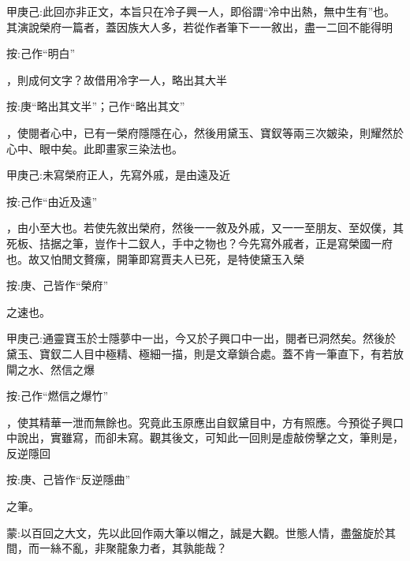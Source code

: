 
\begin{parag}
    \begin{note}甲庚己:此回亦非正文，本旨只在冷子興一人，即俗謂“冷中出熱，無中生有”也。其演說榮府一篇者，蓋因族大人多，若從作者筆下一一敘出，盡一二回不能得明\begin{subnote}按:己作“明白”\end{subnote}，則成何文字？故借用冷字一人，略出其大半\begin{subnote}按:庚“略出其文半”；己作“略出其文”\end{subnote}，使閱者心中，已有一榮府隱隱在心，然後用黛玉、寶釵等兩三次皴染，則耀然於心中、眼中矣。此即畫家三染法也。\end{note}
\end{parag}


\begin{parag}
    \begin{note}甲庚己:未寫榮府正人，先寫外戚，是由遠及近\begin{subnote}按:己作“由近及遠”\end{subnote}，由小至大也。若使先敘出榮府，然後一一敘及外戚，又一一至朋友、至奴僕，其死板、拮据之筆，豈作十二釵人，手中之物也？今先寫外戚者，正是寫榮國一府也。故又怕閒文贅瘰，開筆即寫賈夫人已死，是特使黛玉入榮\begin{subnote}按:庚、己皆作“榮府”\end{subnote}之速也。\end{note}
\end{parag}


\begin{parag}
    \begin{note}甲庚己:通靈寶玉於士隱夢中一出，今又於子興口中一出，閱者已洞然矣。然後於黛玉、寶釵二人目中極精、極細一描，則是文章鎖合處。蓋不肯一筆直下，有若放閘之水、然信之爆\begin{subnote}按:己作“燃信之爆竹”\end{subnote}，使其精華一泄而無餘也。究竟此玉原應出自釵黛目中，方有照應。今預從子興口中說出，實雖寫，而卻未寫。觀其後文，可知此一回則是虛敲傍擊之文，筆則是，反逆隱回\begin{subnote}按:庚、己皆作“反逆隱曲”\end{subnote}之筆。\end{note}
\end{parag}


\begin{parag}
    \begin{note}蒙:以百回之大文，先以此回作兩大筆以帽之，誠是大觀。世態人情，盡盤旋於其間，而一絲不亂，非聚龍象力者，其孰能哉？\end{note}
\end{parag}


